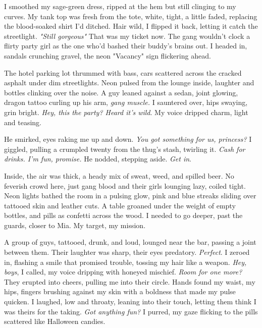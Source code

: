 \documentclass[12pt,oneside]{book} %
\begin{document}
I smoothed my sage-green dress, ripped at the hem but still clinging to my curves. My tank top was fresh from the tote, white, tight, a little faded, replacing the blood-soaked shirt I’d ditched. Hair wild, I flipped it back, letting it catch the streetlight. \textit{"Still gorgeous"} That was my ticket now. The gang wouldn’t clock a flirty party girl as the one who’d bashed their buddy’s brains out. I headed in, sandals crunching gravel, the neon "Vacancy" sign flickering ahead.

The hotel parking lot thrummed with bass, cars scattered across the cracked asphalt under dim streetlights. Neon pulsed from the lounge inside, laughter and bottles clinking over the noise. A guy leaned against a sedan, joint glowing, dragon tattoo curling up his arm, \textit{gang muscle.} I sauntered over, hips swaying, grin bright. \textit{Hey, this the party? Heard it’s wild}. My voice dripped charm, light and teasing.

He smirked, eyes raking me up and down. \textit{You got something for us, princess?} I giggled, pulling a crumpled twenty from the thug’s stash, twirling it. \textit{Cash for drinks. I’m fun, promise.} He nodded, stepping aside. \textit{Get in}.

Inside, the air was thick, a heady mix of sweat, weed, and spilled beer. No feverish crowd here, just gang blood and their girls lounging lazy, coiled tight. Neon lights bathed the room in a pulsing glow, pink and blue streaks sliding over tattooed skin and leather cuts. A table groaned under the weight of empty bottles, and pills as confetti across the wood. I needed to go deeper, past the guards, closer to Mia. My target, my mission.

A group of guys, tattooed, drunk, and loud, lounged near the bar, passing a joint between them. Their laughter was sharp, their eyes predatory. \textit{Perfect}. I zeroed in, flashing a smile that promised trouble, tossing my hair like a weapon. \textit{Hey, boys}, I called, my voice dripping with honeyed mischief. \textit{Room for one more?} They erupted into cheers, pulling me into their circle. Hands found my waist, my hips, fingers brushing against my skin with a boldness that made my pulse quicken. I laughed, low and throaty, leaning into their touch, letting them think I was theirs for the taking. \textit{Got anything fun?} I purred, my gaze flicking to the pills scattered like Halloween candies.
\end{document}
